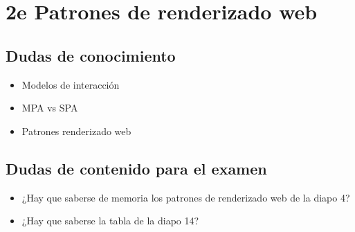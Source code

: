 \section*{2e Patrones de renderizado web}
\subsection*{Dudas de conocimiento}
\begin{itemize}
    \item Modelos de interacción
    \item MPA vs SPA
    \item Patrones renderizado web
\end{itemize}

\subsection*{Dudas de contenido para el examen}
\begin{itemize}
    \item ¿Hay que saberse de memoria los patrones de renderizado web de la diapo 4?
    \item ¿Hay que saberse la tabla de la diapo 14?
    
\end{itemize}